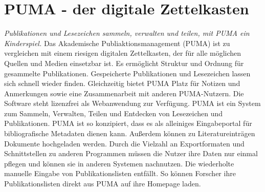 \section{PUMA - der digitale Zettelkasten}
\textit{Publikationen und Lesezeichen sammeln, verwalten und teilen, mit PUMA ein Kinderspiel.}\newline
\newline
Das Akademische Publiaktionsmanagement (PUMA) ist zu vergleichen mit einem riesigen digitalen Zettelkasten, der für alle möglichen Quellen und Medien einsetzbar ist. Es ermöglicht Struktur und Ordnung für gesammelte Publikationen. Gespeicherte Publikationen und Lesezeichen lassen sich schnell wieder finden. Gleichzeitig bietet PUMA Platz für Notizen und Anmerkungen sowie eine Zusammenarbeit mit anderen PUMA-Nutzern. 
Die Software steht lizenzfrei als Webanwendung zur Verfügung.\newline
PUMA ist ein System zum Sammeln, Verwalten, Teilen und Entdecken von Lesezeichen und Publikationen. \newline
\newline 
PUMA ist so konzipiert, dass es als alleiniges Eingabeportal für bibliografische Metadaten dienen kann. Außerdem können zu Literatureinträgen Dokumente hochgeladen werden. \newline
Durch die Vielzahl an Exportformaten und Schnittstellen zu anderen Programmen müssen die Nutzer ihre Daten nur einmal pflegen und können sie in anderen Systemen nachnutzen. Die wiederholte manuelle Eingabe von Publikationslisten entfällt. So können Forscher ihre Publikationslisten direkt aus PUMA auf ihre Homepage laden.  
